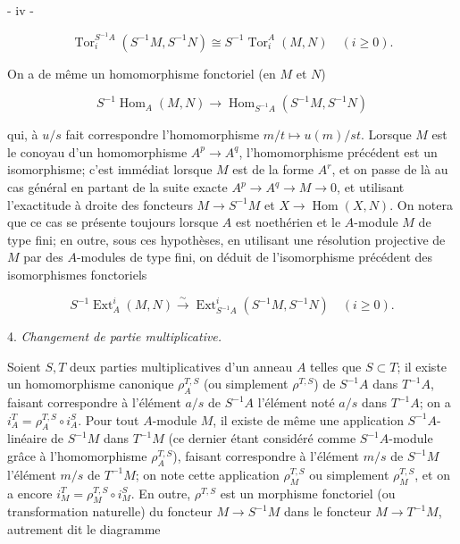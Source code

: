 \newpage


- iv -

$$\operatorname{Tor}_i^{S^{-1}A}(S^{-1}M, S^{-1}N) \cong S^{-1}\operatorname{Tor}_i^A(M, N) \quad (i \ge 0).$$

On a de même un homomorphisme fonctoriel (en $M$ et $N$)

$$S^{-1}\operatorname{Hom}_A(M, N) \to \operatorname{Hom}_{S^{-1}A}(S^{-1}M, S^{-1}N)$$

qui, à $u/s$ fait correspondre l'homomorphisme $m/t \mapsto u(m)/st$. Lorsque $M$ est le conoyau d'un homomorphisme $A^p \to A^q$, l'homomorphisme précédent est un isomorphisme; c'est immédiat lorsque $M$ est de la forme $A^r$, et on passe de là au cas général en partant de la suite exacte $A^p \to A^q \to M \to 0$, et utilisant l'exactitude à droite des foncteurs $M \to S^{-1}M$ et $X \to \operatorname{Hom}(X, N)$. On notera que ce cas se présente toujours lorsque $A$ est noethérien et le $A$-module $M$ de type fini; en outre, sous ces hypothèses, en utilisant une résolution projective de $M$ par des $A$-modules de type fini, on déduit de l'isomorphisme précédent des isomorphismes fonctoriels

$$S^{-1}\operatorname{Ext}_A^i(M, N) \xrightarrow{\sim} \operatorname{Ext}_{S^{-1}A}^i(S^{-1}M, S^{-1}N) \quad (i \ge 0).$$

4. \emph{Changement de partie multiplicative.}

Soient $S, T$ deux parties multiplicatives d'un anneau $A$ telles que $S \subset T$; il existe un homomorphisme canonique $\rho_A^{T, S}$ (ou simplement $\rho^{T, S}$) de $S^{-1}A$ dans $T^{-1}A$, faisant correspondre à l'élément $a/s$ de $S^{-1}A$ l'élément noté $a/s$ dans $T^{-1}A$; on a $i_A^T = \rho_A^{T, S} \circ i_A^S$. Pour tout $A$-module $M$, il existe de même une application $S^{-1}A$-linéaire de $S^{-1}M$ dans $T^{-1}M$ (ce dernier étant considéré comme $S^{-1}A$-module grâce à l'homomorphisme $\rho_A^{T, S}$), faisant correspondre à l'élément $m/s$ de $S^{-1}M$ l'élément $m/s$ de $T^{-1}M$; on note cette application $\rho_M^{T, S}$ ou simplement $\rho_M^{T, S}$, et on a encore $i_M^T = \rho_M^{T, S} \circ i_M^S$. En outre, $\rho^{T, S}$ est un morphisme fonctoriel (ou transformation naturelle) du foncteur $M \to S^{-1}M$ dans le foncteur $M \to T^{-1}M$, autrement dit le diagramme


